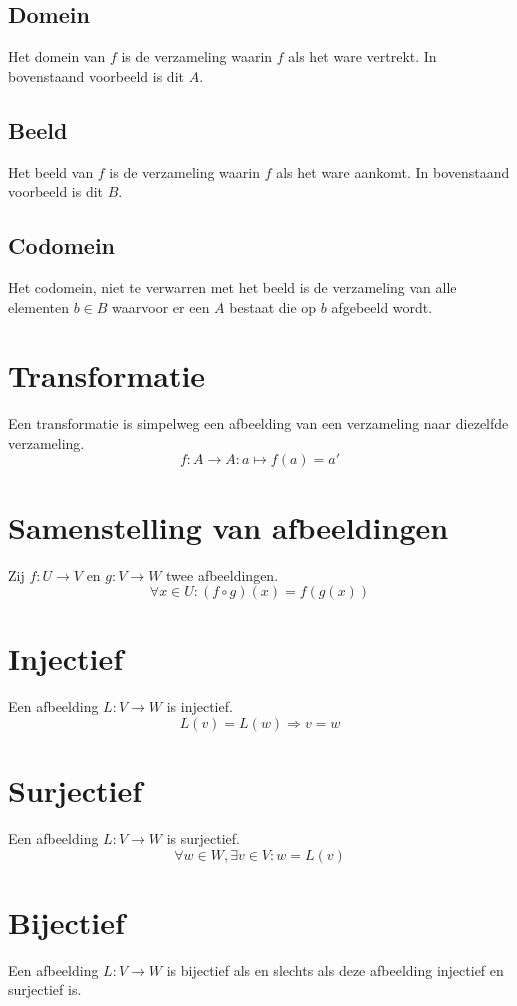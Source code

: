 \documentclass[lineaire_algebra_oplossingen.tex]{subfiles}
\begin{document}
\subsection{Domein}
\label{domain}
Het domein van $f$ is de verzameling waarin $f$ als het ware vertrekt. In bovenstaand voorbeeld is dit $A$.

\subsection{Beeld}
\label{beeld}
Het beeld van $f$ is de verzameling waarin $f$ als het ware aankomt. In bovenstaand voorbeeld is dit $B$.

\subsection{Codomein}
\label{codomein}
Het codomein, niet te verwarren met het beeld is de verzameling van alle elementen $b\in B$ waarvoor er een $A$ bestaat die op $b$ afgebeeld wordt.

\section{Transformatie}
Een transformatie is simpelweg een afbeelding van een verzameling naar diezelfde verzameling.
\[
f : A \rightarrow A : a \mapsto f(a)=a'
\]

\section{Samenstelling van afbeeldingen}
\label{samenstelling_van_afbeeldingen}
Zij $f: U \rightarrow V$ en $g: V\rightarrow W$ twee afbeeldingen.
\[
\forall x\in U: (f \circ g)(x) = f(g(x))
\]

\section{Injectief}
\label{injectief}
Een afbeelding $L: V \rightarrow W$ is injectief.
\[
L(v) = L(w) \Rightarrow v = w
\]

\section{Surjectief}
\label{surjectief}
Een afbeelding $L: V \rightarrow W$ is surjectief.
\[
\forall w \in W, \exists v \in V: w=L(v)
\]

\section{Bijectief}
\label{bijectief}
Een afbeelding $L: V \rightarrow W$ is bijectief als en slechts als deze afbeelding injectief en surjectief is.
\end{document}

